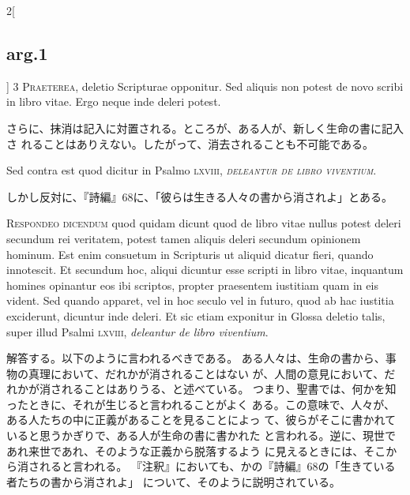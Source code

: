 \documentclass[paper=a4paper,fontsize=10pt,jafontsize=9pt,titlepage]{jlreq}
\begin{document}
\begin{paracol}{2}[\subsection{arg.1}]
{\scshape 3 Praeterea}, deletio Scripturae
opponitur. Sed aliquis non potest de novo scribi in libro vitae. Ergo
neque inde deleri potest.

\switchcolumn

さらに、抹消は記入に対置される。ところが、ある人が、新しく生命の書に記入さ
 れることはありえない。したがって、消去されることも不可能である。

\switchcolumn*[\subsection{s.c.}]

Sed contra est quod dicitur in Psalmo
\scshape{lxviii}, {\itshape deleantur de libro viventium}.

\switchcolumn

しかし反対に、『詩編』68に、「彼らは生きる人々の書から消されよ」とある。


{\scshape Respondeo dicendum} quod quidam dicunt quod de
libro vitae nullus potest deleri secundum rei veritatem, potest tamen
aliquis deleri secundum opinionem hominum. Est enim consuetum in
Scripturis ut aliquid dicatur fieri, quando innotescit. Et secundum hoc,
aliqui dicuntur esse scripti in libro vitae, inquantum homines opinantur
eos ibi scriptos, propter praesentem iustitiam quam in eis vident. Sed
quando apparet, vel in hoc seculo vel in futuro, quod ab hac iustitia
exciderunt, dicuntur inde deleri. 
Et sic etiam exponitur in Glossa
deletio talis, super illud Psalmi {\scshape lxviii}, {\itshape deleantur de libro
viventium}.

\switchcolumn

解答する。以下のように言われるべきである。
ある人々は、生命の書から、事物の真理において、だれかが消されることはない
 が、人間の意見において、だれかが消されることはありうる、と述べている。
 つまり、聖書では、何かを知ったときに、それが生じると言われることがよく
 ある。この意味で、人々が、ある人たちの中に正義があることを見ることによっ
 て、彼らがそこに書かれていると思うかぎりで、ある人が生命の書に書かれた
 と言われる。逆に、現世であれ来世であれ、そのような正義から脱落するよう
 に見えるときには、そこから消されると言われる。
『注釈』においても、かの『詩編』68の「生きている者たちの書から消されよ」
 について、そのように説明されている。


\end{paracol}
\end{document}
